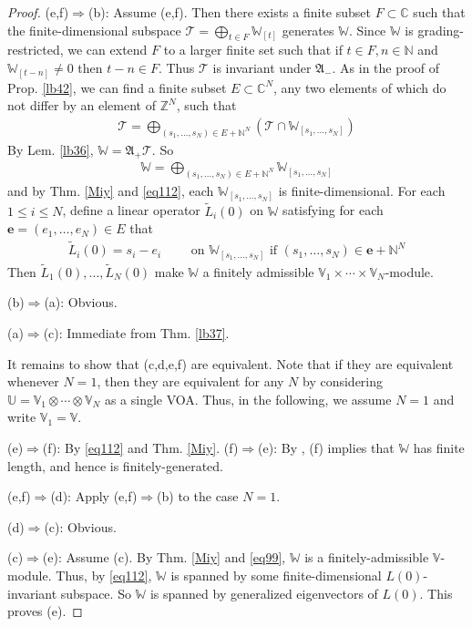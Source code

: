 \documentclass[11pt,b5paper,notitlepage]{article}
\theoremstyle{definition}
\theoremstyle{plain}
\newcommand{\fk}{\mathfrak}
\newcommand{\mc}{\mathcal}
\newcommand{\wtd}{\widetilde}
\newcommand{\mbf}{\mathbf}
\newcommand{\Vbb}{\mathbb V}
\newcommand{\Ubb}{\mathbb U}
\newcommand{\Wbb}{\mathbb W}
\newcommand{\Cbb}{\mathbb C}
\newcommand{\Nbb}{\mathbb N}
\newcommand{\Zbb}{\mathbb Z}
\newcommand{\<}{\left\langle}
\renewcommand{\>}{\right\rangle}
\numberwithin{equation}{section}
\begin{document}
\begin{proof}
(e,f)$\Rightarrow$(b): Assume (e,f). Then there exists a finite subset $F\subset\Cbb$ such that the finite-dimensional subspace $\mc T=\bigoplus_{t\in F}\Wbb_{[t]}$ generates $\Wbb$. Since $\Wbb$ is grading-restricted, we can extend $F$ to a larger finite set such that if $t\in F,n\in\Nbb$ and $\Wbb_{[t-n]}\neq 0$ then $t-n\in F$. Thus $\mc T$ is invariant under $\fk A_-$. As in the proof of Prop. \ref{lb42}, we can find a finite subset $E\subset\Cbb^N$, any two elements of which do not differ by an element of $\Zbb^N$, such that
\begin{align*}
\mc T=\bigoplus_{(s_1,\dots,s_N)\in E+\Nbb^N} (\mc T\cap\Wbb_{[s_1,\dots,s_N]})
\end{align*}
By Lem. \ref{lb36}, $\Wbb=\fk A_+\mc T$. So
\begin{align*}
\Wbb=\bigoplus_{(s_1,\dots,s_N)\in E+\Nbb^N}\Wbb_{[s_1,\dots,s_N]}
\end{align*}
and by Thm. \ref{Miy} and \eqref{eq112}, each $\Wbb_{[s_1,\dots,s_N]}$ is finite-dimensional. For each $1\leq i\leq N$, define a linear operator $\wtd L_i(0)$ on $\Wbb$ satisfying for each $\mbf e=(e_1,\dots,e_N)\in E$ that
\begin{align*}
\wtd L_i(0)=s_i-e_i \qquad\text{ on }\Wbb_{[s_1,\dots,s_N]}\text{ if } (s_1,\dots,s_N)\in\mbf e+\Nbb^N
\end{align*} 
Then $\wtd L_1(0),\dots,\wtd L_N(0)$ make $\Wbb$ a finitely admissible $\Vbb_1\times\cdots\times\Vbb_N$-module.

(b)$\Rightarrow$(a): Obvious. 

(a)$\Rightarrow$(c): Immediate from Thm. \ref{lb37}.


It remains to show that (c,d,e,f) are equivalent. Note that if they are equivalent whenever $N=1$, then they are equivalent for any $N$ by considering $\Ubb=\Vbb_1\otimes\cdots\otimes\Vbb_N$ as a single VOA. Thus, in the following, we assume $N=1$ and write $\Vbb_1=\Vbb$.

(e)$\Rightarrow$(f): By \eqref{eq112} and Thm. \ref{Miy}. (f)$\Rightarrow$(e): By \cite[Prop. 4.3]{Hua-projectivecover}, (f) implies that $\Wbb$ has finite length, and hence is finitely-generated.

(e,f)$\Rightarrow$(d): Apply (e,f)$\Rightarrow$(b) to the case $N=1$.

(d)$\Rightarrow$(c): Obvious.

(c)$\Rightarrow$(e): Assume (c). By Thm. \ref{Miy} and \eqref{eq99}, $\Wbb$ is a finitely-admissible $\Vbb$-module. Thus, by \eqref{eq112}, $\Wbb$ is spanned by some finite-dimensional $L(0)$-invariant subspace. So $\Wbb$ is spanned by generalized eigenvectors of $L(0)$. This proves (e).
\end{proof}
\end{document}
